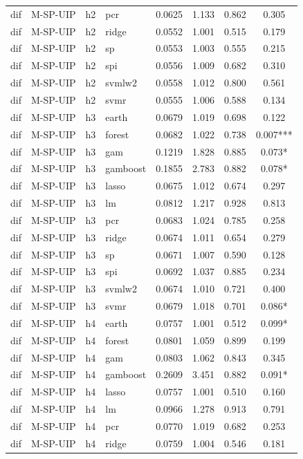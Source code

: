 \begin{ThreePartTable}
\begin{longtable}[t]{llclcccc}
dif & M-SP-UIP & h2 & pcr & 0.0625 & 1.133 & 0.862 & 0.305\\
dif & M-SP-UIP & h2 & ridge & 0.0552 & 1.001 & 0.515 & 0.179\\
dif & M-SP-UIP & h2 & sp & 0.0553 & 1.003 & 0.555 & 0.215\\
dif & M-SP-UIP & h2 & spi & 0.0556 & 1.009 & 0.682 & 0.310\\
dif & M-SP-UIP & h2 & svmlw2 & 0.0558 & 1.012 & 0.800 & 0.561\\
dif & M-SP-UIP & h2 & svmr & 0.0555 & 1.006 & 0.588 & 0.134\\
\addlinespace
dif & M-SP-UIP & h3 & earth & 0.0679 & 1.019 & 0.698 & 0.122\\
dif & M-SP-UIP & h3 & forest & 0.0682 & 1.022 & 0.738 & 0.007***\\
dif & M-SP-UIP & h3 & gam & 0.1219 & 1.828 & 0.885 & 0.073*\\
dif & M-SP-UIP & h3 & gamboost & 0.1855 & 2.783 & 0.882 & 0.078*\\
dif & M-SP-UIP & h3 & lasso & 0.0675 & 1.012 & 0.674 & 0.297\\
dif & M-SP-UIP & h3 & lm & 0.0812 & 1.217 & 0.928 & 0.813\\
dif & M-SP-UIP & h3 & pcr & 0.0683 & 1.024 & 0.785 & 0.258\\
dif & M-SP-UIP & h3 & ridge & 0.0674 & 1.011 & 0.654 & 0.279\\
dif & M-SP-UIP & h3 & sp & 0.0671 & 1.007 & 0.590 & 0.128\\
dif & M-SP-UIP & h3 & spi & 0.0692 & 1.037 & 0.885 & 0.234\\
dif & M-SP-UIP & h3 & svmlw2 & 0.0674 & 1.010 & 0.721 & 0.400\\
dif & M-SP-UIP & h3 & svmr & 0.0679 & 1.018 & 0.701 & 0.086*\\
\addlinespace
dif & M-SP-UIP & h4 & earth & 0.0757 & 1.001 & 0.512 & 0.099*\\
dif & M-SP-UIP & h4 & forest & 0.0801 & 1.059 & 0.899 & 0.199\\
dif & M-SP-UIP & h4 & gam & 0.0803 & 1.062 & 0.843 & 0.345\\
dif & M-SP-UIP & h4 & gamboost & 0.2609 & 3.451 & 0.882 & 0.091*\\
dif & M-SP-UIP & h4 & lasso & 0.0757 & 1.001 & 0.510 & 0.160\\
dif & M-SP-UIP & h4 & lm & 0.0966 & 1.278 & 0.913 & 0.791\\
dif & M-SP-UIP & h4 & pcr & 0.0770 & 1.019 & 0.682 & 0.253\\
dif & M-SP-UIP & h4 & ridge & 0.0759 & 1.004 & 0.546 & 0.181\\

\end{longtable}
\end{ThreePartTable}
